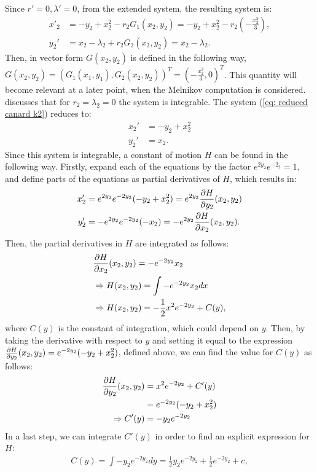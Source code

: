 Since $r'=0, \lambda'=0$, from the extended system, the resulting system is:
\begin{align}
 x'_2&=-y_2+x_2^2-r_2G_1(x_2,y_2) =-y_2+x_2^2-r_2\left(-\frac{x^3_2}{3} \right) ,\\
y_2'&=x_2-\lambda_2+r_2G_2(x_2,y_2)= x_2-\lambda_2. %
\label{eq: reduced canard k2}
\end{align}
Then, in vector form  $G(x_2,y_2)$ is defined in the following way, $G(x_2,y_2)=(G_1(x_1,y_1),G_2(x_2,y_2))^T=(-\frac{x^3_2}{3},0)^T$. This quantity will become relevant at a later point, when the Melnikov computation is considered.
 \citet{krupa2001} discusses that for $r_2=\lambda_2=0$ the system is integrable.
The system (\ref{eq: reduced canard k2}) reduces to:
\begin{align*}
x_2' &= -y_2 +x_2^2 \\
y_2' &= x_2.
\end{align*}
Since this system is integrable, a constant of motion $H$ can be found in the following way.
Firstly, expand each of the equations by the factor $e^{2y_2}e^{-2_2}=1$, and define parts of the equations as partial derivatives of $H$, which results in:
\begin{align*}
x_2' &=e^{2y_2}e^{-2y_2}( -y_2 +x_2^2 ) =e^{2y_2}\pd{H}{y_2}(x_2,y_2) \\
y_2' &= - e^{2y_2}e^{-2y_2}(-  x_2)=-e^{2y_2}\pd{H}{x_2}(x_2,y_2).
\end{align*}
Then, the partial derivatives in $H$ are integrated as follows:
\begin{align*}
&\pd{H}{x_2}(x_2,y_2) = -e^{-2y_2} x_2 \\
&\Rightarrow H(x_2,y_2) = \int -e^{-2y_2} x_2 dx\\
&\Rightarrow H(x_2,y_2) = - \frac{1}{2} x^2 e^{-2y_2} + C(y),
\end{align*}
where $C(y)$ is the constant of integration, which could depend on $y$.
Then, by taking the derivative with respect to $y$ and setting it equal to the expression $\pd{H}{y_2}(x_2,y_2)=e^{-2y_2}( -y_2 +x_2^2 )$, defined above, we can find the value for $C(y)$ as follows: 
\begin{align*}
\pd{H}{y_2}(x_2,y_2)&= x^2 e^{-2y_2} + C'(y)\\
&= e^{-2y_2}( -y_2 +x_2^2 )\\
\Rightarrow C'(y) &= - y_2 e^{-2y_2}
\end{align*}
In a last step, we can integrate $C'(y)$ in order to find an explicit expression for $H$:
\begin{align*}
C(y) = \int - y_2 e^{-2y_2} dy = \frac{1}{2} y_2 e^{-2y_2} + \frac{1}{2} e^{-2y_2} + c,
\end{align*}

